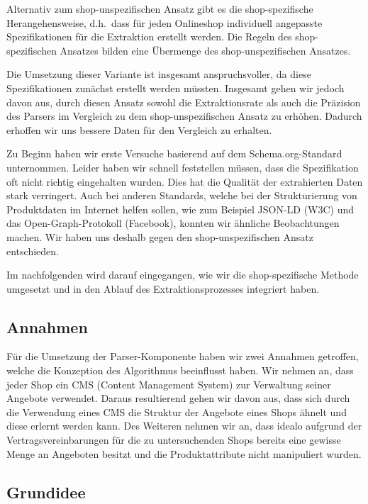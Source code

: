Alternativ zum shop-unspezifischen Ansatz gibt es die shop-spezifische Herangehensweise, d.h.\ dass für jeden
Onlineshop individuell angepasste Spezifikationen für die Extraktion erstellt werden.
Die Regeln des shop-spezifischen Ansatzes bilden eine Übermenge des shop-unspezifischen Ansatzes.

Die Umsetzung dieser Variante ist insgesamt anspruchsvoller, da diese Spezifikationen zunächst erstellt werden müssten.
Insgesamt gehen wir jedoch davon aus, durch diesen Ansatz sowohl die Extraktionsrate als auch die Präzision des Parsers
im Vergleich zu dem shop-unspezifischen Ansatz zu erhöhen.
Dadurch erhoffen wir uns bessere Daten für den Vergleich zu erhalten.

Zu Beginn haben wir erste Versuche basierend auf dem Schema.org-Standard unternommen.
Leider haben wir schnell feststellen müssen, dass die Spezifikation oft nicht richtig eingehalten wurden.
Dies hat die Qualität der extrahierten Daten stark verringert.
Auch bei anderen Standards, welche bei der Strukturierung von Produktdaten im Internet helfen sollen, wie zum Beispiel
JSON-LD (W3C) und das Open-Graph-Protokoll (Facebook), konnten wir ähnliche Beobachtungen machen.
Wir haben uns deshalb gegen den shop-unspezifischen Ansatz entschieden.

Im nachfolgenden wird darauf eingegangen, wie wir die shop-spezifische Methode umgesetzt und in den Ablauf des
Extraktionsprozesses integriert haben.

\subsection{Annahmen}
\label{subsec:annahmen}

Für die Umsetzung der Parser-Komponente haben wir zwei Annahmen getroffen, welche die Konzeption des Algorithmus
beeinflusst haben.
Wir nehmen an, dass jeder Shop ein CMS (Content Management System) zur Verwaltung seiner Angebote verwendet.
Daraus resultierend gehen wir davon aus, dass sich durch die Verwendung eines CMS die Struktur der Angebote eines Shops
ähnelt und diese erlernt werden kann.
Des Weiteren nehmen wir an, dass idealo aufgrund der Vertragsvereinbarungen für die zu untersuchenden Shops bereits
eine gewisse Menge an Angeboten besitzt und die Produktattribute nicht manipuliert wurden.

\subsection{Grundidee}
\label{subsec:grundidee}

